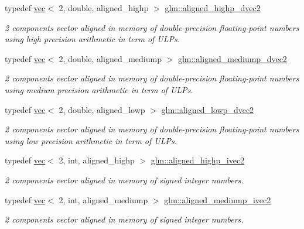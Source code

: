 \begin{DoxyCompactItemize}
typedef \hyperlink{structglm_1_1vec}{vec}$<$ 2, double, aligned\+\_\+highp $>$ \hyperlink{group__gtc__type__aligned_gadc0edec95aa740d8ec351ef1e2dd39de}{glm\+::aligned\+\_\+highp\+\_\+dvec2}
\begin{DoxyCompactList}\small\item\em 2 components vector aligned in memory of double-\/precision floating-\/point numbers using high precision arithmetic in term of U\+L\+Ps. \end{DoxyCompactList}\item 
typedef \hyperlink{structglm_1_1vec}{vec}$<$ 2, double, aligned\+\_\+mediump $>$ \hyperlink{group__gtc__type__aligned_gab67579d5dcc90f9e4ab28cc92a467eee}{glm\+::aligned\+\_\+mediump\+\_\+dvec2}
\begin{DoxyCompactList}\small\item\em 2 components vector aligned in memory of double-\/precision floating-\/point numbers using medium precision arithmetic in term of U\+L\+Ps. \end{DoxyCompactList}\item 
typedef \hyperlink{structglm_1_1vec}{vec}$<$ 2, double, aligned\+\_\+lowp $>$ \hyperlink{group__gtc__type__aligned_ga82d3a1058d43fa4547f56e8d5c7fb5ca}{glm\+::aligned\+\_\+lowp\+\_\+dvec2}
\begin{DoxyCompactList}\small\item\em 2 components vector aligned in memory of double-\/precision floating-\/point numbers using low precision arithmetic in term of U\+L\+Ps. \end{DoxyCompactList}\item 
typedef \hyperlink{structglm_1_1vec}{vec}$<$ 2, int, aligned\+\_\+highp $>$ \hyperlink{group__gtc__type__aligned_ga34105808a80ef5dabd7807997dfef328}{glm\+::aligned\+\_\+highp\+\_\+ivec2}
\begin{DoxyCompactList}\small\item\em 2 components vector aligned in memory of signed integer numbers. \end{DoxyCompactList}\item 
typedef \hyperlink{structglm_1_1vec}{vec}$<$ 2, int, aligned\+\_\+mediump $>$ \hyperlink{group__gtc__type__aligned_ga21c35fcb068f6d38f3aaed915c3e3b5a}{glm\+::aligned\+\_\+mediump\+\_\+ivec2}
\begin{DoxyCompactList}\small\item\em 2 components vector aligned in memory of signed integer numbers. \end{DoxyCompactList}\item 

\end{DoxyCompactItemize}
